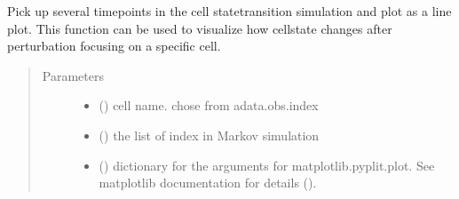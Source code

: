 \documentclass[letterpaper,10pt,english]{sphinxmanual}
\begin{document}
\begin{fulllineitems}
\begin{fulllineitems}
\begin{quote}
\begin{description}
\begin{itemize}
\end{itemize}

\end{description}\end{quote}

\end{fulllineitems}


\begin{fulllineitems}
\label{\detokenize{modules/celloracle:celloracle.Oracle.plot_mc_result_as_trajectory}}
Pick up several timepoints in the cell state\sphinxhyphen{}transition simulation and plot as a line plot.
This function can be used to visualize how cell\sphinxhyphen{}state changes after perturbation focusing on a specific cell.
\begin{quote}\begin{description}
\item[{Parameters}] \leavevmode\begin{itemize}
\item {} 
 () \textendash{} cell name. chose from adata.obs.index

\item {} 
 () \textendash{} the list of index in Markov simulation

\item {} 
 () \textendash{} dictionary for the arguments for matplotlib.pyplit.plot.
See matplotlib documentation for details ().

\end{itemize}

\end{description}\end{quote}

\end{fulllineitems}


\end{fulllineitems}
\end{document}
